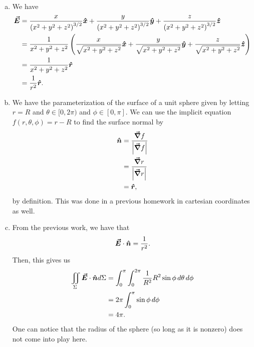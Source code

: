 \documentclass[12pt]{article} %
\newcommand{\grad}{\boldsymbol{\vec{\nabla}}}
\newcommand{\vecfieldE}{\boldsymbol{\vec{E}}}
\newcommand{\rhat}{\boldsymbol{\hat{r}}}
\begin{document}
\begin{solution}~
\begin{enumerate}[(a)]
    \item We have
    \begin{align*}
    \vecfieldE &= \frac{x}{\left(x^2+y^2+z^2\right)^{3/2}} \xhat + \frac{y}{\left(x^2+y^2+z^2\right)^{3/2}} \yhat + \frac{z}{\left(x^2+y^2+z^2\right)^{3/2}} \zhat\\
     &= \frac{1}{x^2+y^2+z^2} \left( \frac{x}{\sqrt{x^2+y^2+z^2}} \xhat + \frac{y}{\sqrt{x^2+y^2+z^2}} \yhat + \frac{z}{\sqrt{x^2+y^2+z^2}} \zhat\right)\\
     &= \frac{1}{x^2+y^2+z^2} \rhat\\
     &= \frac{1}{r^2} \rhat.
    \end{align*}
    \item We have the parameterization of the surface of a unit sphere given by letting $r=R$ and $\theta \in [0,2\pi)$ and $\phi \in [0,\pi]$. We can use the implicit equation $f(r,\theta,\phi)=r-R$ to find the surface normal by
    \begin{align*}
        \unitvec &= \frac{\grad f}{\left| \grad f \right|} \\
        &= \frac{\grad r}{\left|\grad r\right|}\\
        &= \rhat,
    \end{align*}
    by definition. This was done in a previous homework in cartesian coordinates as well.
    \item From the previous work, we have that
    \[
    \vecfieldE \cdot \unitvec = \frac{1}{r^2}.  
    \]
    Then, this gives us
    \begin{align*}
        \iint_{\Sigma} \vecfieldE \cdot \unitvec d\Sigma &= \int_0^\pi \int_0^{2\pi} \frac{1}{R^2} R^2 \sin \phi  \, d\theta \, d\phi \\
        &= 2\pi \int_0^\pi \sin \phi \, d \phi\\
        &= 4 \pi.  
    \end{align*}
    One can notice that the radius of the sphere (so long as it is nonzero) does not come into play here.
\end{enumerate} 
\end{solution}
\end{document}
